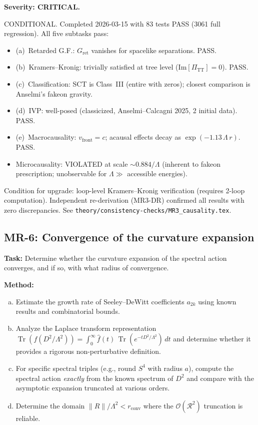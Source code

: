 \documentclass[12pt,a4paper]{article}
\newcommand{\Tr}{\operatorname{Tr}}
\newcommand{\task}[1]{\noindent\textbf{Task:} #1\par}
\newcommand{\method}[1]{\noindent\textbf{Method:} #1\par}
\begin{document}
\textbf{Severity: CRITICAL.}

\textcolor{near}{CONDITIONAL.}
Completed 2026-03-15 with 83 tests PASS (3061 full regression).
All five subtasks pass:
\begin{itemize}[nosep]
  \item (a)~Retarded G.F.: $G_{\mathrm{ret}}$ vanishes for spacelike separations. PASS.
  \item (b)~Kramers--Kronig: trivially satisfied at tree level ($\mathrm{Im}[\Pi_{\mathrm{TT}}] = 0$). PASS.
  \item (c)~Classification: SCT is Class~III (entire with zeros); closest
    comparison is Anselmi's fakeon gravity.
  \item (d)~IVP: well-posed (classicized, Anselmi--Calcagni 2025, 2 initial data). PASS.
  \item (e)~Macrocausality: $v_{\mathrm{front}} = c$; acausal effects decay
    as $\exp(-1.13\,\Lambda\,r)$. PASS.
  \item Microcausality: VIOLATED at scale $\sim 0.884/\Lambda$ (inherent to fakeon
    prescription; unobservable for $\Lambda \gg$ accessible energies).
\end{itemize}
Condition for upgrade: loop-level Kramers--Kronig verification (requires 2-loop computation).
Independent re-derivation (MR3-DR) confirmed all results with zero discrepancies.
See \texttt{theory/consistency-checks/MR3\_causality.tex}.

\subsection{MR-6: Convergence of the curvature expansion}
\label{task:MR6}

\task{Determine whether the curvature expansion of the spectral action
converges, and if so, with what radius of convergence.}

\method{
\begin{enumerate}[(a)]
  \item Estimate the growth rate of Seeley--DeWitt coefficients $a_{2k}$
    using known results and combinatorial bounds.
  \item Analyze the Laplace transform representation
    $\Tr(f(D^2/\Lambda^2)) = \int_0^\infty \hat{f}(t)\,\Tr(e^{-tD^2/\Lambda^2})\,dt$
    and determine whether it provides a rigorous non-perturbative definition.
  \item For specific spectral triples (e.g., round $S^4$ with radius $a$),
    compute the spectral action \emph{exactly} from the known spectrum of
    $D^2$ and compare with the asymptotic expansion truncated at various orders.
  \item Determine the domain $\|R\|/\Lambda^2 < r_{\text{conv}}$ where the
    $\mathcal{O}(\mathcal{R}^2)$ truncation is reliable.
\end{enumerate}
}
\end{document}
